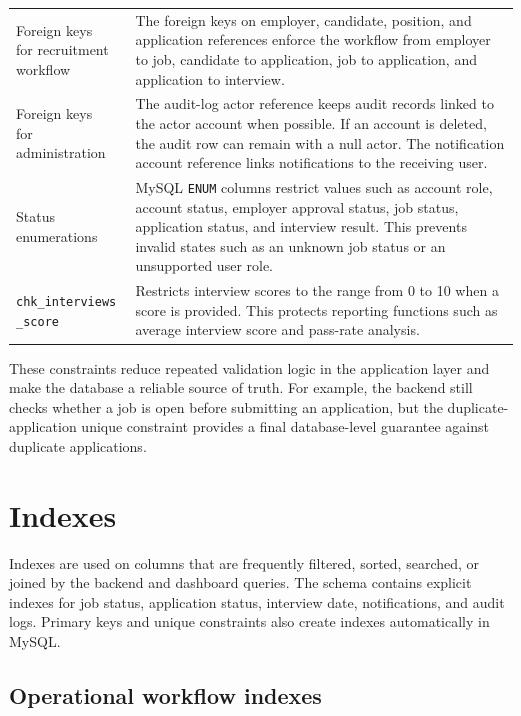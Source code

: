\documentclass[11pt,a4paper]{report}
\makeatletter
\newcommand{\codebreak}[1]{\begin{tabular}[t]{@{}l@{}}#1\end{tabular}}
\makeatother
\begin{document}
\begin{longtable}{L{0.27\textwidth}L{0.63\textwidth}}
\codebreak{Foreign keys\\for recruitment\\workflow} & The foreign keys on employer, candidate, position, and application references enforce the workflow from employer to job, candidate to application, job to application, and application to interview. \\
\codebreak{Foreign keys\\for administration} & The audit-log actor reference keeps audit records linked to the actor account when possible. If an account is deleted, the audit row can remain with a null actor. The notification account reference links notifications to the receiving user. \\
Status enumerations & MySQL \texttt{ENUM} columns restrict values such as account role, account status, employer approval status, job status, application status, and interview result. This prevents invalid states such as an unknown job status or an unsupported user role. \\
\codebreak{\texttt{chk\_interviews}\\\texttt{\_score}} & Restricts interview scores to the range from 0 to 10 when a score is provided. This protects reporting functions such as average interview score and pass-rate analysis. \\
\bottomrule
\end{longtable}

These constraints reduce repeated validation logic in the application layer and make the database a reliable source of truth. For example, the backend still checks whether a job is open before submitting an application, but the duplicate-application unique constraint provides a final database-level guarantee against duplicate applications.

\section{Indexes}

Indexes are used on columns that are frequently filtered, sorted, searched, or joined by the backend and dashboard queries. The schema contains explicit indexes for job status, application status, interview date, notifications, and audit logs. Primary keys and unique constraints also create indexes automatically in MySQL.

\subsection*{Operational workflow indexes}
\end{document}
